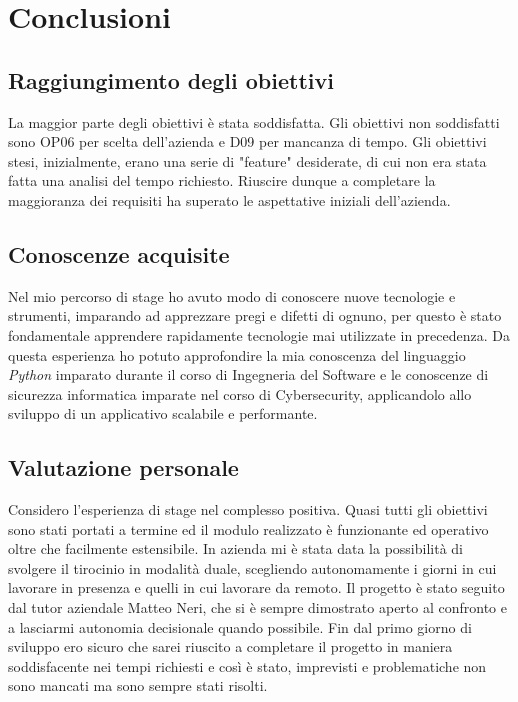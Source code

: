 

\chapter{Conclusioni}
\label{cap:conclusioni}

\section{Raggiungimento degli obiettivi}
La maggior parte degli obiettivi è stata soddisfatta. Gli obiettivi non soddisfatti sono OP06 per scelta dell'azienda e D09 per mancanza di tempo. Gli obiettivi stesi, inizialmente, erano una serie di "feature" desiderate, di cui non era stata fatta una analisi del tempo richiesto. Riuscire dunque a completare la maggioranza dei requisiti ha superato le aspettative iniziali dell'azienda.

\section{Conoscenze acquisite}
Nel mio percorso di stage ho avuto modo di conoscere nuove tecnologie e strumenti, imparando ad apprezzare pregi e difetti di ognuno, per questo è stato fondamentale apprendere rapidamente tecnologie mai utilizzate in precedenza.
Da questa esperienza ho potuto approfondire la mia conoscenza del linguaggio \textit{Python} imparato durante il corso di Ingegneria del Software e le conoscenze di sicurezza informatica imparate nel corso di Cybersecurity, applicandolo allo sviluppo di un applicativo scalabile e performante.

\section{Valutazione personale}

Considero l'esperienza di stage nel complesso positiva. Quasi tutti gli obiettivi sono stati portati a termine ed il modulo realizzato è funzionante ed operativo oltre che facilmente estensibile. In azienda mi è stata data la possibilità di svolgere il tirocinio in modalità duale, scegliendo autonomamente i giorni in cui lavorare in presenza e quelli in cui lavorare da remoto. Il progetto è stato seguito dal tutor aziendale Matteo Neri, che si è sempre dimostrato aperto al confronto e a lasciarmi autonomia decisionale quando possibile. \newline{}
Fin dal primo giorno di sviluppo ero sicuro che sarei riuscito a completare il progetto in maniera soddisfacente nei tempi richiesti e così è stato, imprevisti e problematiche non sono mancati ma sono sempre stati risolti.
